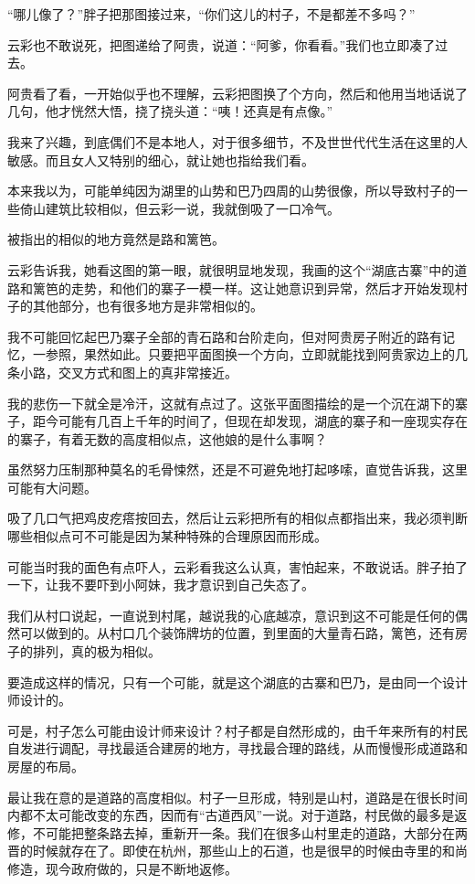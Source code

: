 “哪儿像了？”胖子把那图接过来，“你们这儿的村子，不是都差不多吗？”

云彩也不敢说死，把图递给了阿贵，说道：“阿爹，你看看。”我们也立即凑了过去。

阿贵看了看，一开始似乎也不理解，云彩把图换了个方向，然后和他用当地话说了几句，他才恍然大悟，挠了挠头道：“咦！还真是有点像。”

我来了兴趣，到底偶们不是本地人，对于很多细节，不及世世代代生活在这里的人敏感。而且女人又特别的细心，就让她也指给我们看。

本来我以为，可能单纯因为湖里的山势和巴乃四周的山势很像，所以导致村子的一些倚山建筑比较相似，但云彩一说，我就倒吸了一口冷气。

被指出的相似的地方竟然是路和篱笆。

云彩告诉我，她看这图的第一眼，就很明显地发现，我画的这个“湖底古寨”中的道路和篱笆的走势，和他们的寨子一模一样。这让她意识到异常，然后才开始发现村子的其他部分，也有很多地方是非常相似的。

我不可能回忆起巴乃寨子全部的青石路和台阶走向，但对阿贵房子附近的路有记忆，一参照，果然如此。只要把平面图换一个方向，立即就能找到阿贵家边上的几条小路，交叉方式和图上的真非常接近。

我的悲伤一下就全是冷汗，这就有点过了。这张平面图描绘的是一个沉在湖下的寨子，距今可能有几百上千年的时间了，但现在却发现，湖底的寨子和一座现实存在的寨子，有着无数的高度相似点，这他娘的是什么事啊？

虽然努力压制那种莫名的毛骨悚然，还是不可避免地打起哆嗦，直觉告诉我，这里可能有大问题。

吸了几口气把鸡皮疙瘩按回去，然后让云彩把所有的相似点都指出来，我必须判断哪些相似点可不可能是因为某种特殊的合理原因而形成。

可能当时我的面色有点吓人，云彩看我这么认真，害怕起来，不敢说话。胖子拍了一下，让我不要吓到小阿妹，我才意识到自己失态了。

我们从村口说起，一直说到村尾，越说我的心底越凉，意识到这不可能是任何的偶然可以做到的。从村口几个装饰牌坊的位置，到里面的大量青石路，篱笆，还有房子的排列，真的极为相似。

要造成这样的情况，只有一个可能，就是这个湖底的古寨和巴乃，是由同一个设计师设计的。

可是，村子怎么可能由设计师来设计？村子都是自然形成的，由千年来所有的村民自发进行调配，寻找最适合建房的地方，寻找最合理的路线，从而慢慢形成道路和房屋的布局。

最让我在意的是道路的高度相似。村子一旦形成，特别是山村，道路是在很长时间内都不太可能改变的东西，因而有“古道西风”一说。对于道路，村民做的最多是返修，不可能把整条路去掉，重新开一条。我们在很多山村里走的道路，大部分在两晋的时候就存在了。即使在杭州，那些山上的石道，也是很早的时候由寺里的和尚修造，现今政府做的，只是不断地返修。

